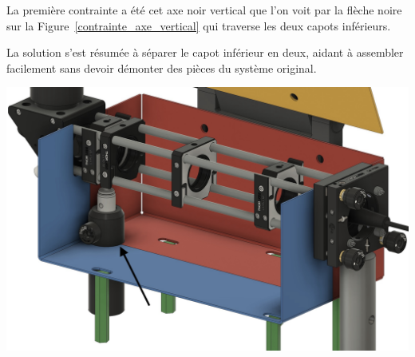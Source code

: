 \begin{minipage}[c]{0.4\textwidth}
    La première contrainte a été cet axe noir vertical que l'on voit par la flèche noire sur la Figure~\ref{contrainte_axe_vertical} qui traverse les deux capots inférieurs.

    La solution s'est résumée à séparer le capot inférieur en deux, aidant à assembler facilement sans devoir démonter des pièces du système original.
\end{minipage}\hfill
\begin{minipage}[c]{0.58\textwidth}
    \begin{center}
        \includegraphics[width=\textwidth]{assets/figures/Protections_laser/Securite_mecanique/Protection_entree_laser/contrainte_axe_vertical.jpeg}
    \end{center}
    \label{contrainte_axe_vertical}
\end{minipage}

